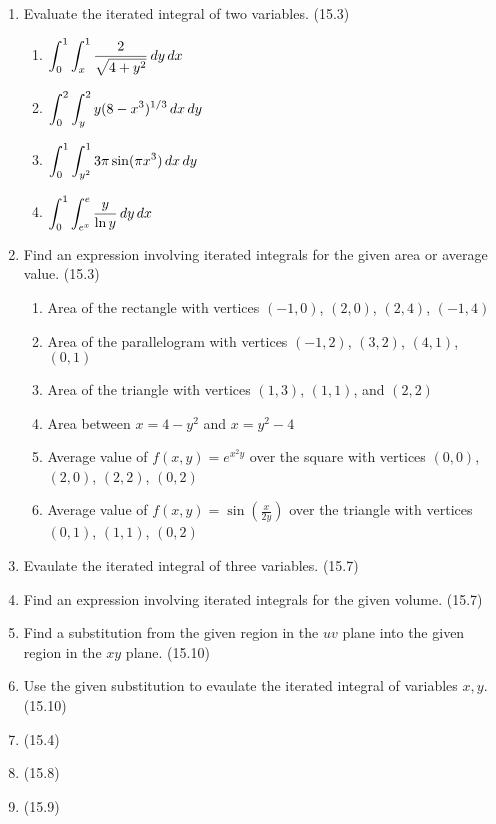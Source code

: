 \begin{enumerate}
    \newpage

    \item Evaluate the iterated integral of two variables. (15.3)

      \begin{enumerate}
        \item $\displaystyle\int_0^1\int_x^1 \frac{2}{\sqrt{4+y^2}}\,d{y}\,d{x}$
        \item $\displaystyle\int_0^2\int_y^2 y(8-x^3)^{1/3}\,d{x}\,d{y}$
        \item $\displaystyle\int_0^1\int_{y^2}^1 3\pi \sin(\pi x^3)\,d{x}\,d{y}$
        \item $\displaystyle\int_0^1\int_{e^x}^e \frac{y}{\ln y}\,d{y}\,d{x}$
      \end{enumerate}

    \item Find an expression involving iterated integrals for the given area or average value. (15.3)

      \begin{enumerate}
        \item Area of the rectangle with vertices $(-1,0)$, $(2,0)$, $(2,4)$, $(-1,4)$
        \item Area of the parallelogram with vertices $(-1,2)$, $(3,2)$, $(4,1)$, $(0,1)$
        \item Area of the triangle with vertices $(1,3)$, $(1,1)$, and $(2,2)$
        \item Area between $x=4-y^2$ and $x=y^2-4$
        \item Average value of $f(x,y)=e^{x^2y}$ over the square with vertices $(0,0)$, $(2,0)$, $(2,2)$, $(0,2)$
        \item Average value of $f(x,y)=\sin(\frac{x}{2y})$ over the triangle with vertices $(0,1)$, $(1,1)$, $(0,2)$
      \end{enumerate}

    \item Evaulate the iterated integral of three variables. (15.7)

    \item Find an expression involving iterated integrals for the given volume. (15.7)

    \item Find a substitution from the given region in the $uv$ plane into the given region in the $xy$ plane. (15.10)

    \item Use the given substitution to evaulate the iterated integral of variables $x,y$. (15.10)

    \item (15.4)

    \item (15.8)

    \item (15.9)

    \end{enumerate}



